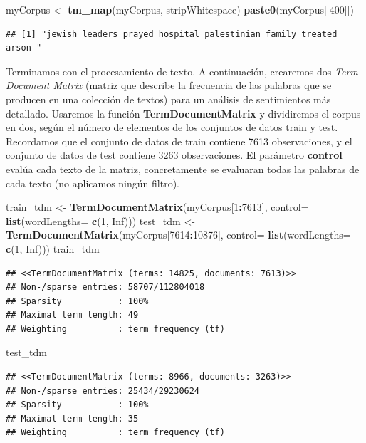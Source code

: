 \documentclass[
]{article}
\newenvironment{Shaded}{\begin{snugshade}}{\end{snugshade}}
\newcommand{\DataTypeTok}[1]{\textcolor[rgb]{0.13,0.29,0.53}{#1}}
\newcommand{\DecValTok}[1]{\textcolor[rgb]{0.00,0.00,0.81}{#1}}
\newcommand{\KeywordTok}[1]{\textcolor[rgb]{0.13,0.29,0.53}{\textbf{#1}}}
\newcommand{\NormalTok}[1]{#1}
\newcommand{\OperatorTok}[1]{\textcolor[rgb]{0.81,0.36,0.00}{\textbf{#1}}}
\newcommand{\OtherTok}[1]{\textcolor[rgb]{0.56,0.35,0.01}{#1}}
\newcommand{\StringTok}[1]{\textcolor[rgb]{0.31,0.60,0.02}{#1}}
\begin{document}
\begin{Shaded}
\begin{Highlighting}[]
\NormalTok{myCorpus <-}\StringTok{ }\KeywordTok{tm_map}\NormalTok{(myCorpus, stripWhitespace)}
\KeywordTok{paste0}\NormalTok{(myCorpus[[}\DecValTok{400}\NormalTok{]])}
\end{Highlighting}
\end{Shaded}

\begin{verbatim}
## [1] "jewish leaders prayed hospital palestinian family treated arson "
\end{verbatim}

Terminamos con el procesamiento de texto. A continuación, crearemos dos
\emph{Term Document Matrix} (matriz que describe la frecuencia de las
palabras que se producen en una colección de textos) para un análisis de
sentimientos más detallado. Usaremos la función
\textbf{TermDocumentMatrix} y dividiremos el corpus en dos, según el
número de elementos de los conjuntos de datos train y test. Recordamos
que el conjunto de datos de train contiene 7613 observaciones, y el
conjunto de datos de test contiene 3263 observaciones. El parámetro
\textbf{control} evalúa cada texto de la matriz, concretamente se
evaluaran todas las palabras de cada texto (no aplicamos ningún filtro).

\begin{Shaded}
\begin{Highlighting}[]
\NormalTok{train_tdm <-}\StringTok{ }\KeywordTok{TermDocumentMatrix}\NormalTok{(myCorpus[}\DecValTok{1}\OperatorTok{:}\DecValTok{7613}\NormalTok{], }
                                \DataTypeTok{control=} \KeywordTok{list}\NormalTok{(}\DataTypeTok{wordLengths=} \KeywordTok{c}\NormalTok{(}\DecValTok{1}\NormalTok{, }\OtherTok{Inf}\NormalTok{)))}
\NormalTok{test_tdm <-}\StringTok{ }\KeywordTok{TermDocumentMatrix}\NormalTok{(myCorpus[}\DecValTok{7614}\OperatorTok{:}\DecValTok{10876}\NormalTok{], }
                               \DataTypeTok{control=} \KeywordTok{list}\NormalTok{(}\DataTypeTok{wordLengths=} \KeywordTok{c}\NormalTok{(}\DecValTok{1}\NormalTok{, }\OtherTok{Inf}\NormalTok{)))}
\NormalTok{train_tdm}
\end{Highlighting}
\end{Shaded}

\begin{verbatim}
## <<TermDocumentMatrix (terms: 14825, documents: 7613)>>
## Non-/sparse entries: 58707/112804018
## Sparsity           : 100%
## Maximal term length: 49
## Weighting          : term frequency (tf)
\end{verbatim}

\begin{Shaded}
\begin{Highlighting}[]
\NormalTok{test_tdm}
\end{Highlighting}
\end{Shaded}

\begin{verbatim}
## <<TermDocumentMatrix (terms: 8966, documents: 3263)>>
## Non-/sparse entries: 25434/29230624
## Sparsity           : 100%
## Maximal term length: 35
## Weighting          : term frequency (tf)
\end{verbatim}
\end{document}
